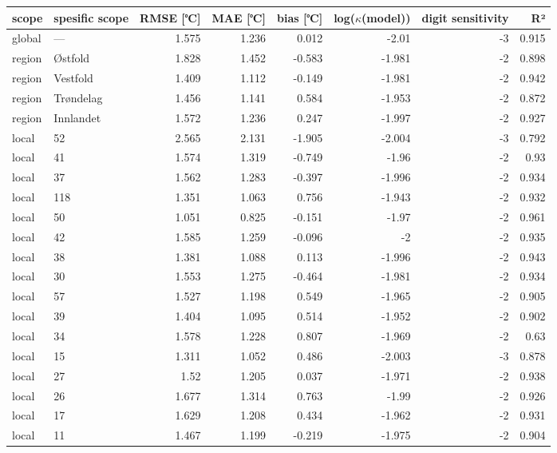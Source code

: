 \begin{tabular}{llrrrrrr}
\hline
 scope   & spesific
scope           &       RMSE
[℃] &   MAE [℃] &        bias
[℃] &   log($\kappa$(model)) &    digit
sensitivity &    R² \\
\hline
 global  & ---       & 1.575 &     1.236 &  0.012 &                 -2.01  & -3 & 0.915 \\
 region  & Østfold   & 1.828 &     1.452 & -0.583 &                 -1.981 & -2 & 0.898 \\
 region  & Vestfold  & 1.409 &     1.112 & -0.149 &                 -1.981 & -2 & 0.942 \\
 region  & Trøndelag & 1.456 &     1.141 &  0.584 &                 -1.953 & -2 & 0.872 \\
 region  & Innlandet & 1.572 &     1.236 &  0.247 &                 -1.997 & -2 & 0.927 \\
 local   & 52        & 2.565 &     2.131 & -1.905 &                 -2.004 & -3 & 0.792 \\
 local   & 41        & 1.574 &     1.319 & -0.749 &                 -1.96  & -2 & 0.93  \\
 local   & 37        & 1.562 &     1.283 & -0.397 &                 -1.996 & -2 & 0.934 \\
 local   & 118       & 1.351 &     1.063 &  0.756 &                 -1.943 & -2 & 0.932 \\
 local   & 50        & 1.051 &     0.825 & -0.151 &                 -1.97  & -2 & 0.961 \\
 local   & 42        & 1.585 &     1.259 & -0.096 &                 -2     & -2 & 0.935 \\
 local   & 38        & 1.381 &     1.088 &  0.113 &                 -1.996 & -2 & 0.943 \\
 local   & 30        & 1.553 &     1.275 & -0.464 &                 -1.981 & -2 & 0.934 \\
 local   & 57        & 1.527 &     1.198 &  0.549 &                 -1.965 & -2 & 0.905 \\
 local   & 39        & 1.404 &     1.095 &  0.514 &                 -1.952 & -2 & 0.902 \\
 local   & 34        & 1.578 &     1.228 &  0.807 &                 -1.969 & -2 & 0.63  \\
 local   & 15        & 1.311 &     1.052 &  0.486 &                 -2.003 & -3 & 0.878 \\
 local   & 27        & 1.52  &     1.205 &  0.037 &                 -1.971 & -2 & 0.938 \\
 local   & 26        & 1.677 &     1.314 &  0.763 &                 -1.99  & -2 & 0.926 \\
 local   & 17        & 1.629 &     1.208 &  0.434 &                 -1.962 & -2 & 0.931 \\
 local   & 11        & 1.467 &     1.199 & -0.219 &                 -1.975 & -2 & 0.904 \\
\hline
\end{tabular}